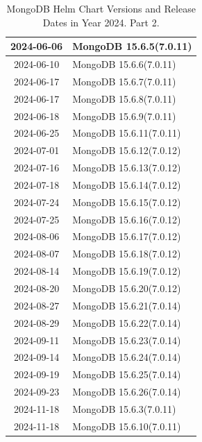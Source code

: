 \documentclass[../main.tex]{subfiles}
\begin{document}
\begin{table}[h]
\begin{minipage}{0.45\textwidth}
\begin{tabular}{|c|l|}
    2024-06-06 & MongoDB 15.6.5(7.0.11) \\ \hline  
    2024-06-10 & MongoDB 15.6.6(7.0.11) \\ \hline  
    2024-06-17 & MongoDB 15.6.7(7.0.11) \\ \hline  
    2024-06-17 & MongoDB 15.6.8(7.0.11) \\ \hline  
    2024-06-18 & MongoDB 15.6.9(7.0.11) \\ \hline  
    2024-06-25 & MongoDB 15.6.11(7.0.11) \\ \hline
    2024-07-01 & MongoDB 15.6.12(7.0.12) \\ \hline  
    2024-07-16 & MongoDB 15.6.13(7.0.12) \\ \hline  
    2024-07-18 & MongoDB 15.6.14(7.0.12) \\ \hline  
    2024-07-24 & MongoDB 15.6.15(7.0.12) \\ \hline  
    2024-07-25 & MongoDB 15.6.16(7.0.12) \\ \hline
    2024-08-06 & MongoDB 15.6.17(7.0.12) \\ \hline  
    2024-08-07 & MongoDB 15.6.18(7.0.12) \\ \hline  
    2024-08-14 & MongoDB 15.6.19(7.0.12) \\ \hline  
    2024-08-20 & MongoDB 15.6.20(7.0.12) \\ \hline  
    2024-08-27 & MongoDB 15.6.21(7.0.14) \\ \hline
    2024-08-29 & MongoDB 15.6.22(7.0.14) \\ \hline
    2024-09-11 & MongoDB 15.6.23(7.0.14) \\ \hline  
    2024-09-14 & MongoDB 15.6.24(7.0.14) \\ \hline  
    2024-09-19 & MongoDB 15.6.25(7.0.14) \\ \hline  
    2024-09-23 & MongoDB 15.6.26(7.0.14) \\ \hline 
    2024-11-18 & MongoDB 15.6.3(7.0.11) \\ \hline
    2024-11-18 & MongoDB 15.6.10(7.0.11) \\ \hline
\end{tabular}
\caption{MongoDB Helm Chart Versions and Release Dates in Year 2024. Part 2. \protect\footnotemark}
\label{table:mongodb_helm_versions}
\end{minipage}
\end{table}

\end{document}
